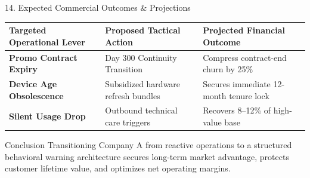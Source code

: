 \documentclass[10pt,aspectratio=169]{beamer}
\begin{document}
\begin{frame}{14. Expected Commercial Outcomes \& Projections}
  \centering
  \small
  \begin{tabular}{lll}
    \toprule
    \textbf{Targeted Operational Lever} & \textbf{Proposed Tactical Action} & \textbf{Projected Financial Outcome} \\
    \midrule
    \textbf{Promo Contract Expiry} & Day 300 Continuity Transition & Compress contract-end churn by 25\% \\
    \textbf{Device Age Obsolescence} & Subsidized hardware refresh bundles & Secures immediate 12-month tenure lock \\
    \textbf{Silent Usage Drop} & Outbound technical care triggers & Recovers 8--12\% of high-value base \\
    \bottomrule
  \end{tabular}
  \vspace{0.4cm}
  \begin{exampleblock}{Conclusion}
    Transitioning Company A from reactive operations to a structured behavioral warning architecture secures long-term market advantage, protects customer lifetime value, and optimizes net operating margins.
  \end{exampleblock}
\end{frame}
\end{document}
